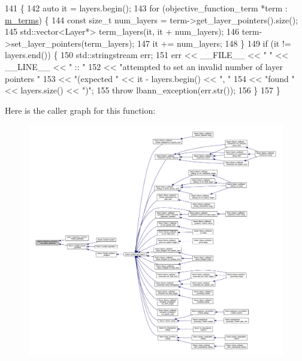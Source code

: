\begin{DoxyCode}
141                                                                     \{
142   \textcolor{keyword}{auto} it = layers.begin();
143   \textcolor{keywordflow}{for} (objective\_function\_term *term : \hyperlink{classlbann_1_1objective__function_aea9c1f90ba9af1b1330efa2ba6adb5e2}{m\_terms}) \{
144     \textcolor{keyword}{const} \textcolor{keywordtype}{size\_t} num\_layers = term->get\_layer\_pointers().size();
145     std::vector<Layer*> term\_layers(it, it + num\_layers);
146     term->set\_layer\_pointers(term\_layers);
147     it += num\_layers;
148   \}
149   \textcolor{keywordflow}{if} (it != layers.end()) \{
150     std::stringstream err;
151     err << \_\_FILE\_\_ << \textcolor{stringliteral}{" "} << \_\_LINE\_\_ << \textcolor{stringliteral}{" :: "}
152         << \textcolor{stringliteral}{"attempted to set an invalid number of layer pointers "}
153         << \textcolor{stringliteral}{"(expected "} << it - layers.begin() << \textcolor{stringliteral}{", "}
154         << \textcolor{stringliteral}{"found "} << layers.size() << \textcolor{stringliteral}{")"};
155     \textcolor{keywordflow}{throw} lbann\_exception(err.str());
156   \}
157 \}
\end{DoxyCode}
Here is the caller graph for this function\+:\nopagebreak
\begin{figure}[H]
\begin{center}
\leavevmode
\includegraphics[width=350pt]{classlbann_1_1objective__function_a0f934e078b55528dd0ec1ec8ad34c73b_icgraph}
\end{center}
\end{figure}
\mbox{\label{classlbann_1_1objective__function_a9c3211354ca1cee8a7ba219f4e56e03c}} 
